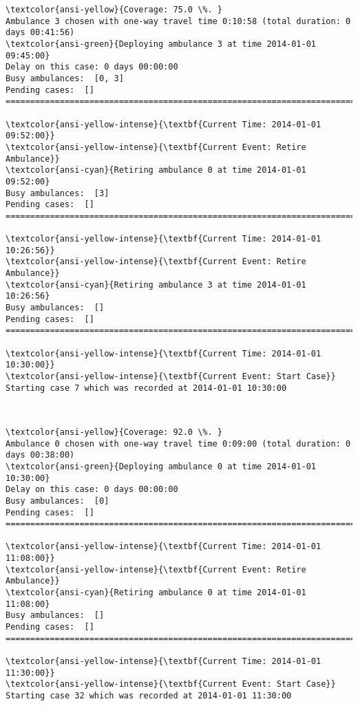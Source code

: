 \documentclass[11pt]{article}
\begin{document}
    \begin{Verbatim}[commandchars=\\\{\}]
\textcolor{ansi-yellow}{Coverage: 75.0 \%. }
Ambulance 3 chosen with one-way travel time 0:10:58 (total duration: 0 days 00:41:56)
\textcolor{ansi-green}{Deploying ambulance 3 at time 2014-01-01 09:45:00}
Delay on this case: 0 days 00:00:00
Busy ambulances:  [0, 3]
Pending cases:  []
========================================================================

\textcolor{ansi-yellow-intense}{\textbf{Current Time: 2014-01-01 09:52:00}}
\textcolor{ansi-yellow-intense}{\textbf{Current Event: Retire Ambulance}}
\textcolor{ansi-cyan}{Retiring ambulance 0 at time 2014-01-01 09:52:00}
Busy ambulances:  [3]
Pending cases:  []
========================================================================

\textcolor{ansi-yellow-intense}{\textbf{Current Time: 2014-01-01 10:26:56}}
\textcolor{ansi-yellow-intense}{\textbf{Current Event: Retire Ambulance}}
\textcolor{ansi-cyan}{Retiring ambulance 3 at time 2014-01-01 10:26:56}
Busy ambulances:  []
Pending cases:  []
========================================================================

\textcolor{ansi-yellow-intense}{\textbf{Current Time: 2014-01-01 10:30:00}}
\textcolor{ansi-yellow-intense}{\textbf{Current Event: Start Case}}
Starting case 7 which was recorded at 2014-01-01 10:30:00

    \end{Verbatim}

    \begin{center}
    \end{center}
    { \hspace*{\fill} \\}
    
    \begin{Verbatim}[commandchars=\\\{\}]
\textcolor{ansi-yellow}{Coverage: 92.0 \%. }
Ambulance 0 chosen with one-way travel time 0:09:00 (total duration: 0 days 00:38:00)
\textcolor{ansi-green}{Deploying ambulance 0 at time 2014-01-01 10:30:00}
Delay on this case: 0 days 00:00:00
Busy ambulances:  [0]
Pending cases:  []
========================================================================

\textcolor{ansi-yellow-intense}{\textbf{Current Time: 2014-01-01 11:08:00}}
\textcolor{ansi-yellow-intense}{\textbf{Current Event: Retire Ambulance}}
\textcolor{ansi-cyan}{Retiring ambulance 0 at time 2014-01-01 11:08:00}
Busy ambulances:  []
Pending cases:  []
========================================================================

\textcolor{ansi-yellow-intense}{\textbf{Current Time: 2014-01-01 11:30:00}}
\textcolor{ansi-yellow-intense}{\textbf{Current Event: Start Case}}
Starting case 32 which was recorded at 2014-01-01 11:30:00

    \end{Verbatim}
\end{document}

